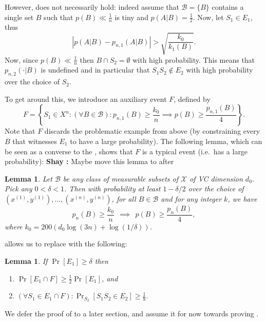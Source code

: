 \documentclass{article}
\def\X{{\mathcal X}}
\def\B{{\mathcal B}}
\newtheorem{lemma}[theorem]{Lemma}
\newcommand{\comment}[3]{{\color{#1} {\bf #2 :} #3}}
\newcommand{\shay}[1]{\comment{purple}{Shay}{#1}}
\begin{document}
However,  does not necessarily hold: indeed assume that $\B=\{B\}$ contains
	a single set $B$ such that $p(B) \ll \frac{1}{n}$ is tiny and $p(A \vert B) = \frac{1}{2}$. 
	Now, let $S_1\in E_1$, thus
	\[
	\left\lvert p(A \vert B) - p_{n,1}(A \vert B) \right\rvert > 
	\sqrt{\frac{k_0}{k_{1}(B)}}.
	\]
	Now, since $p(B) \ll \frac{1}{n}$ then $B\cap S_2 = \emptyset$ with high probability.
	This means that $p_{n,2}(\cdot \vert B)$ is undefined and in particular that $S_1S_2\notin E_2$ 
	with high probability over the choice of $S_2$.

%

To get around this, we introduce an auxiliary event $F$, defined by
\[F = \left\{S_1\in X^{n} : (\forall B\in\B): p_{n,1}(B) \geq \frac{k_0}{n} \implies p(B)\geq \frac{p_{n,1}(B)}{4}\right\}. \]
Note that $F$ discards the problematic example from above 
(by constraining every $B$ that witnesses $E_1$ to have a large probability). 
The following lemma, which can be seen as a converse to the , 
shows that $F$ is a typical event (i.e.\ has a large probability):
\shay{Maybe move this lemma to after \Cref{lemma:points-in-balls}}
\begin{lemma}\label{lem:Fistypical}
Let $\B$ be any class of measurable subsets of $\X$ of VC dimension $d_0$. Pick any $0 < \delta < 1$. Then with probability at least $1-\delta/2$ over the choice of $(x^{(1)}, y^{(1)}), \ldots, (x^{(n)}, y^{(n)})$, for all $B \in \B$ and for any integer $k$, we have
\[ p_n(B) \geq \frac{k_0}{n}
\ \ \implies \ \ 
p(B) \geq \frac{p_n(B)}{4},\]
where $k_0 = 200 \left(d_0 \log(3n) + \log(1/\delta)\right)$.
\end{lemma}

 allows us to replace  with the following:
\begin{lemma}\label{lem:reduction}
If $\Pr[E_1]\geq \delta$ then 
\begin{enumerate}
\item $\Pr[E_1\cap F] \geq \frac{1}{2}\Pr[E_1]$, and
\item $(\forall S_1\in E_1\cap F): \Pr_{S_2}[S_1S_2\in E_2] \geq \frac{1}{8}$. 
\end{enumerate}
\end{lemma}
We defer the proof of  to a later section, 
and assume it for now towards proving .
\end{document}

